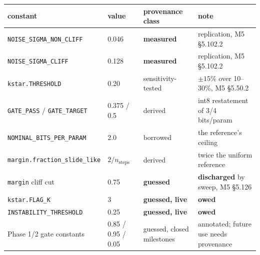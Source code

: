 \footnotesize
\begin{tabular}{@{}p{4.6cm}p{2.1cm}p{3.4cm}p{4.3cm}@{}}
\toprule
constant & value & provenance class & note \\
\midrule
\texttt{NOISE\_SIGMA\_NON\_CLIFF} & 0.046 & \textbf{measured} & replication, M5 \S5.102.2 \\
\texttt{NOISE\_SIGMA\_CLIFF} & 0.128 & \textbf{measured} & replication, M5 \S5.102.2 \\
\texttt{kstar.THRESHOLD} & 0.20 & sensitivity-tested & $\pm15\%$ over 10--30\%, M5 \S5.50.2 \\
\texttt{GATE\_PASS} / \texttt{GATE\_TARGET} & 0.375 / 0.5 & derived & int8 restatement of 3/4 bits/param \\
\texttt{NOMINAL\_BITS\_PER\_PARAM} & 2.0 & borrowed & the reference's ceiling \\
\texttt{margin.fraction\_slide\_like} & $2/n_{\text{steps}}$ & derived & twice the uniform reference \\
\texttt{margin} cliff cut & 0.75 & \textbf{guessed} & \textbf{discharged} by sweep, M5 \S5.126 \\
\texttt{kstar.FLAG\_K} & 3 & \textbf{guessed, live} & \textbf{owed} \\
\texttt{INSTABILITY\_THRESHOLD} & 0.25 & \textbf{guessed, live} & \textbf{owed} \\
Phase 1/2 gate constants & 0.85 / 0.95 / 0.05 & guessed, closed milestones & annotated; future use needs provenance \\
\bottomrule
\end{tabular}
